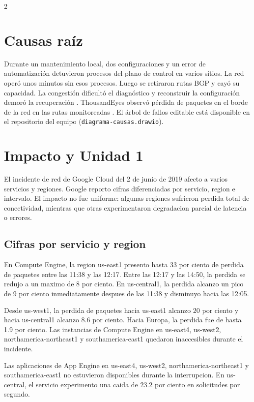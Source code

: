 \documentclass[10pt]{article}
\begin{document}
\begin{multicols}{2}
\section{Causas raíz}

Durante un mantenimiento local, dos configuraciones y un error de automatización detuvieron procesos del plano de control en varios sitios. La red operó unos minutos sin esos procesos. Luego se retiraron rutas BGP y cayó su capacidad. La congestión dificultó el diagnóstico y reconstruir la configuración demoró la recuperación \cite{googlecloud19009}. ThousandEyes observó pérdida de paquetes en el borde de la red en las rutas monitoreadas \cite[fig.~4]{medina2019googlecloud}.
El árbol de fallos editable está disponible en el repositorio del equipo (\texttt{diagrama-causas.drawio}).


\section{Impacto y Unidad 1}

El incidente de red de Google Cloud del 2 de junio de 2019 afecto a varios servicios y
regiones. Google reporto cifras diferenciadas por servicio, region e intervalo. El impacto no
fue uniforme: algunas regiones sufrieron perdida total de conectividad, mientras que otras
experimentaron degradacion parcial de latencia o errores. \cite{googlecloud19009}

\subsection{Cifras por servicio y region}

En Compute Engine, la region us-east1 presento hasta 33 por ciento de perdida de paquetes
entre las 11:38 y las 12:17. Entre las 12:17 y las 14:50, la perdida se redujo a un maximo de
8 por ciento. En us-central1, la perdida alcanzo un pico de 9 por ciento inmediatamente
despues de las 11:38 y disminuyo hacia las 12:05. \cite{googlecloud19009}

Desde us-west1, la perdida de paquetes hacia us-east1 alcanzo 20 por ciento y hacia
us-central1 alcanzo 8.6 por ciento. Hacia Europa, la perdida fue de hasta 1.9 por ciento. Las
instancias de Compute Engine en us-east4, us-west2, northamerica-northeast1 y
southamerica-east1 quedaron inaccesibles durante el incidente. \cite{googlecloud19009}

Las aplicaciones de App Engine en us-east4, us-west2, northamerica-northeast1 y
southamerica-east1 no estuvieron disponibles durante la interrupcion. En us-central, el
servicio experimento una caida de 23.2 por ciento en solicitudes por segundo. \cite{googlecloud19009}


\end{multicols}
\end{document}
